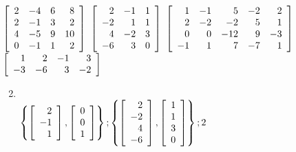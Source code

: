 {{\begin{multicols}{2}
\begin{ex}
\begin{exenumerate}
\exitem
$\left[ \begin{array}{rrrr}
2 & -4 & 6 & 8 \\
2 & -1 & 3 & 2 \\
4 & -5 & 9 & 10\\
0 & -1 & 1 & 2
\end{array} \right]$
\exitem 
$\left[ \begin{array}{rrr}
2 & -1 & 1 \\
-2 & 1 & 1 \\
4 & -2 & 3 \\
-6 & 3 & 0
\end{array} \right]$
\exitem*
$\left[ \begin{array}{rrrrr}
1 & -1 & 5 & -2 & 2 \\
2 & -2 & -2 & 5 & 1 \\
0 & 0 & -12 & 9 & -3 \\
-1 & 1 & 7 & -7 & 1
\end{array} \right]$
\exitem*
$\left[ \begin{array}{rrrr}
1 & 2 & -1 & 3 \\
-3 & -6 & 3 & -2
\end{array} \right]$
\end{exenumerate}
\begin{sol}
\begin{enumerate}[label={\alph*.}]
\setcounter{enumi}{1}
\item \hspace{1em} \\
\hspace*{-2em}$
\left\{
\left[ \begin{array}{r}
2\\
-1\\
1
\end{array} \right], \left[ \begin{array}{r}
0\\
0\\
1
\end{array} \right]
\right\};
\left\{
\left[ \begin{array}{r}
2\\
-2\\
4\\
-6
\end{array} \right], \left[ \begin{array}{r}
1\\
1\\
3\\
0
\end{array} \right]
\right\}; 2$


\end{enumerate}
\end{sol}
\end{ex}
\end{multicols}}}
